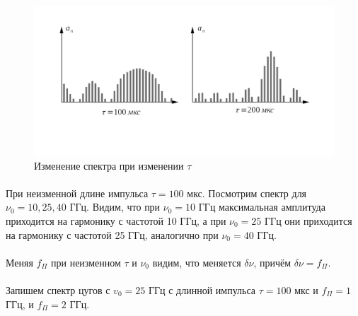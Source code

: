 \documentclass[a4paper,12pt]{article} %
\begin{document}
\begin{figure}[h]
\begin{center}
\includegraphics[width=6in]{image 2.png}
\caption{Изменение спектра при изменении $\tau$}
\label{fig:img2}
\end{center}
\end{figure}


\paragraph{} При неизменной длине импульса $\tau = 100$ мкс. Посмотрим спектр для $\nu_0 = 10, 25, 40$ ГГц. Видим, что при $\nu_0 = 10$ ГГц максимальная амплитуда приходится на гармонику с частотой 10 ГГц, а при $\nu_0 = 25$ ГГц они приходится на гармонику с частотой 25 ГГц, аналогично при $\nu_0 = 40$ ГГц.

\paragraph{} Меняя $f_\Pi$ при неизменном $\tau$ и $\nu_0$ видим, что меняется $\delta \nu$, причём $\delta \nu = f_\Pi$.

\paragraph{} Запишем спектр цугов с $v_0 = 25$ ГГц с длинной импульса $\tau = 100$ мкс и $f_\Pi = 1$ ГГц, и $f_\Pi = 2$ ГГц.
\end{document}
